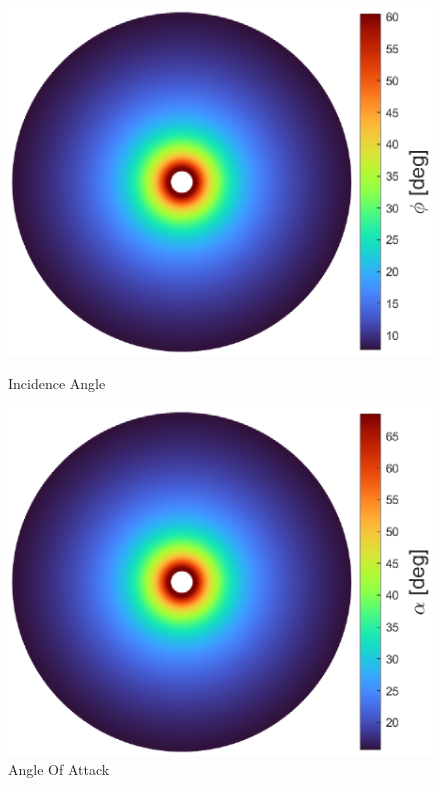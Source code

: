 {\begin{figure}[!htb]
    \centering
    \begin{minipage}{0.49\textwidth}
        \centering
        \includegraphics[width=\textwidth]{Figures/comp_method/sim_B/phi.eps}
        \caption[Incidence angle]{Incidence Angle}
        \label{fig:paper_incidenceangle}
    \end{minipage}%
    \hfill
    \begin{minipage}{0.49\textwidth}
        \centering
        \includegraphics[width=\textwidth]{Figures/comp_method/sim_B/alpha.eps}
        \caption[Angle Of Attack]{Angle Of Attack}
        \label{fig:paper_angleofattack}
    \end{minipage}
\end{figure}



}
